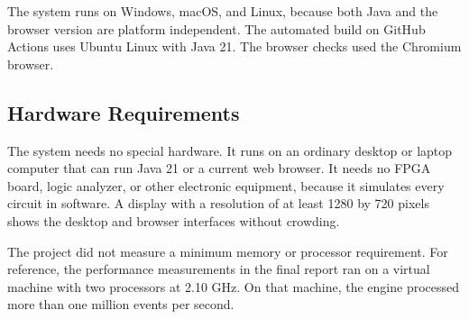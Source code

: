 The system runs on Windows, macOS, and Linux, because both Java and the browser version are platform independent.
The automated build on GitHub Actions uses Ubuntu Linux with Java 21.
The browser checks used the Chromium browser.

\subsection{Hardware Requirements}

The system needs no special hardware.
It runs on an ordinary desktop or laptop computer that can run Java 21 or a current web browser.
It needs no FPGA board, logic analyzer, or other electronic equipment, because it simulates every circuit in software.
A display with a resolution of at least 1280 by 720 pixels shows the desktop and browser interfaces without crowding.

The project did not measure a minimum memory or processor requirement.
For reference, the performance measurements in the final report ran on a virtual machine with two processors at 2.10 GHz.
On that machine, the engine processed more than one million events per second.
